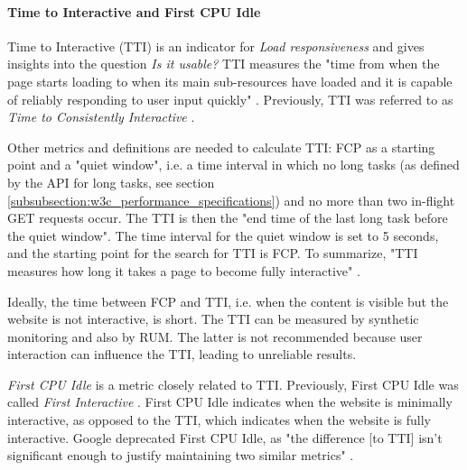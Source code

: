 
\paragraph{Time to Interactive and First CPU Idle} %


Time to Interactive (TTI) is an indicator for \textit{Load responsiveness} and gives insights into the question \textit{Is it usable?}
TTI measures the "time from when the page starts loading to when its main sub-resources have loaded and it is capable of reliably responding to user input quickly" \cite{2019WaltonTTI}.
Previously, TTI was referred to as \textit{Time to Consistently Interactive} \cite{2017GoogleInteractive}.

Other metrics and definitions are needed to calculate TTI:
FCP as a starting point and a "quiet window", i.e. a time interval in which no long tasks (as defined by the API for long tasks, see section \ref{subsubsection:w3c_performance_specifications}) and no more than two in-flight GET requests occur.
The TTI is then the "end time of the last long task before the quiet window".
The time interval for the quiet window is set to 5 seconds, and the starting point for the search for TTI is FCP.
To summarize, "TTI measures how long it takes a page to become fully interactive" \cite{2021GoogleTTI}.

Ideally, the time between FCP and TTI, i.e. when the content is visible but the website is not interactive, is short.
The TTI can be measured by synthetic monitoring and also by RUM.
The latter is not recommended because user interaction can influence the TTI, leading to unreliable results.


\textit{First CPU Idle} is a metric closely related to TTI.
Previously, First CPU Idle was called \textit{First Interactive} \cite{2017GoogleInteractive}.
First CPU Idle indicates when the website is minimally interactive, as opposed to the TTI, which indicates when the website is fully interactive.
Google deprecated First CPU Idle, as "the difference [to TTI] isn't significant enough to justify maintaining two similar metrics" \cite{2019GoogleFirstCPUIdle}.


